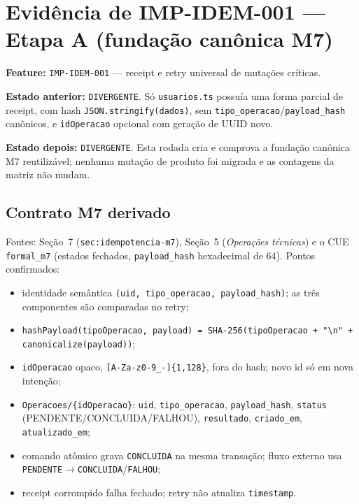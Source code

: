\section{Evidência de IMP-IDEM-001 --- Etapa A (fundação canônica M7)}

\textbf{Feature:} \texttt{IMP-IDEM-001} --- receipt e retry universal de mutações
críticas.

\textbf{Estado anterior:} \texttt{DIVERGENTE}. Só \texttt{usuarios.ts} possuía
uma forma parcial de receipt, com hash \texttt{JSON.stringify(dados)}, sem
\texttt{tipo\_operacao}/\texttt{payload\_hash} canônicos, e \texttt{idOperacao}
opcional com geração de UUID novo.

\textbf{Estado depois:} \texttt{DIVERGENTE}. Esta rodada cria e comprova a
fundação canônica M7 reutilizável; nenhuma mutação de produto foi migrada e as
contagens da matriz não mudam.

\subsection{Contrato M7 derivado}

Fontes: Seção~7 (\texttt{sec:idempotencia-m7}), Seção~5
(\textit{Operações técnicas}) e o CUE \texttt{formal\_m7} (estados fechados,
\texttt{payload\_hash} hexadecimal de 64). Pontos confirmados:

\begin{itemize}
  \item identidade semântica \texttt{(uid, tipo\_operacao, payload\_hash)}; as
  três componentes são comparadas no retry;
  \item \texttt{hashPayload(tipoOperacao, payload) =
  SHA-256(tipoOperacao + "\textbackslash n" + canonicalize(payload))};
  \item \texttt{idOperacao} opaco, \texttt{[A-Za-z0-9\_-]\{1,128\}}, fora do
  hash; novo id só em nova intenção;
  \item \texttt{Operacoes/\{idOperacao\}}: \texttt{uid}, \texttt{tipo\_operacao},
  \texttt{payload\_hash}, \texttt{status} (PENDENTE/CONCLUIDA/FALHOU),
  \texttt{resultado}, \texttt{criado\_em}, \texttt{atualizado\_em};
  \item comando atômico grava \texttt{CONCLUIDA} na mesma transação; fluxo
  externo usa \texttt{PENDENTE}$\rightarrow$\texttt{CONCLUIDA}/\texttt{FALHOU};
  \item receipt corrompido falha fechado; retry não atualiza \texttt{timestamp}.
\end{itemize}

